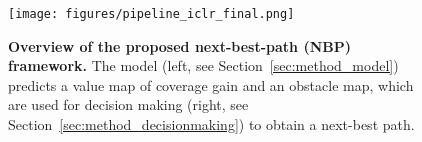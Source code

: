 \begin{figure}[t]
    \centering
     \texttt{[image: figures/pipeline\_iclr\_final.png]}
    \caption{\textbf{Overview of the proposed next-best-path (NBP) framework.} 
    The model (left, see Section~\ref{sec:method_model}) predicts a value map of coverage gain and an obstacle map, which are used for decision making (right, see Section~\ref{sec:method_decisionmaking}) to obtain a next-best path.
    }
    \label{fig:pipeline}
    \vspace{-1em}
\end{figure}